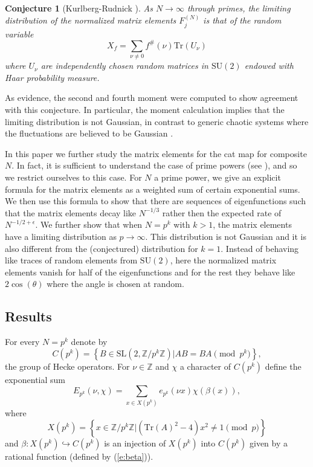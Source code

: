 \documentclass[12pt]{amsart}
\newtheorem*{conj}{Conjecture}
\theoremstyle{definition}
\theoremstyle{remark}
\numberwithin{equation}{section}
\newcommand{\set}[1]{\left\{#1\right\}}
\newcommand{\bbZ}{\mathbb{Z}}
\newcommand{\Tr}{ \mbox{Tr}}
\newcommand{\SL}{ \mathrm{SL}}
\newcommand{\SU}{ \mathrm{SU}}
\begin{document}
\begin{conj}[Kurlberg-Rudnick \cite{KurRud05}]
As $N\to\infty$ through primes, the limiting distribution of the
normalized matrix elements $F_j^{(N)}$ is that of the random
variable
\[X_f=\sum_{\nu\neq 0}
f^\#(\nu) \Tr(U_\nu)\] where $U_\nu$ are independently chosen random
matrices in $\SU(2)$ endowed with Haar probability measure.
\end{conj}
As evidence, the second and fourth moment were computed to show
agreement with this conjecture. In particular, the moment
calculation implies that the limiting distribution is not Gaussian,
in contrast to generic chaotic systems where the fluctuations are
believed to be Gaussian \cite{EckhardtFishman95,FeingoldPeres86}.

In this paper we further study the matrix elements for the cat map
for composite $N$. In fact, it is sufficient to understand the case
of prime powers (see \cite[Section 4.1]{KurRud2000}), and so we
restrict ourselves to this case. For $N$ a prime power, we give an
explicit formula for the matrix elements as a weighted sum of
certain exponential sums. We then use this formula to show that
there are sequences of eigenfunctions such that the matrix elements
decay like $N^{-1/3}$ rather then the expected rate of
$N^{-1/2+\epsilon}$. We further show that when $N=p^k$ with $k>1$,
the matrix elements have a limiting distribution as $p\to\infty$.
This distribution is not Gaussian and it is also different from the
(conjectured) distribution for $k=1$. Instead of behaving like
traces of random elements from $\SU(2)$, here the normalized matrix
elements vanish for half of the eigenfunctions and for the rest they
behave like $2\cos(\theta)$ where the angle is chosen at random.


\subsection{Results}
For every $N=p^k$ denote by
$$C(p^k)=\set{B\in \SL(2,\bbZ/p^k\bbZ)| AB=BA\pmod {p^k}},$$
the group of Hecke operators. For $\nu\in\bbZ$ and $\chi$ a
character of $C(p^k)$ define the exponential sum
\[E_{p^k}(\nu,\chi)=\sum_{x\in X(p^k)}e_{p^k}(\nu x)\chi(\beta(x)),\]
where $$X(p^k)=\set{x\in\bbZ/p^k\bbZ|(\Tr(A)^2-4)x^2\neq
1\pmod{p}}$$ and $\beta\colon X(p^k)\hookrightarrow C(p^k)$ is an
injection of $X(p^k)$ into $C(p^k)$ given by a rational function
(defined by (\ref{e:beta})).
\end{document}
